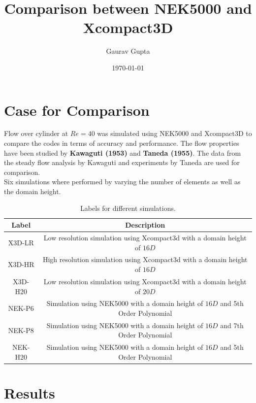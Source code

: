 \documentclass[11pt]{article}
\title{Comparison between NEK5000 and Xcompact3D}
\author{Gaurav Gupta}
\date{\today}
\begin{document}
\maketitle


\section{Case for Comparison}
Flow over cylinder at $Re=40$ was simulated using NEK5000 and Xcompact3D to compare the codes in terms of accuracy and performance.
The flow properties have been studied by \textbf{Kawaguti (1953)} and \textbf{Taneda (1955)}. The data from the steady flow analysis by Kawaguti
and experiments by Taneda are used for comparison.\\

\noindent Six simulations where performed by varying the number of elements as well as the domain height.

\begin{table}[H]
    \caption{Labels for different simulations.}
    \begin{tabular}{|c|c|}
        \hline
        \textbf{Label} & \textbf{Description}                                                            \\
        \hline
        X3D-LR         & Low resolution simulation using Xcompact3d with a domain height of $16D$        \\
        \hline
        X3D-HR         & High resolution simulation using Xcompact3d with a domain height of $16D$       \\
        \hline
        X3D-H20        & Low resolution simulation using Xcompact3d with a domain height of $20D$        \\
        \hline
        NEK-P6         & Simulation using NEK5000 with a domain height of $16D$ and 5th Order Polynomial \\
        \hline
        NEK-P8         & Simulation using NEK5000 with a domain height of $16D$ and 7th Order Polynomial \\
        \hline
        NEK-H20        & Simulation using NEK5000 with a domain height of $16D$ and 5th Order Polynomial \\
        \hline
    \end{tabular}
\end{table}

\section{Results}
\end{document}
